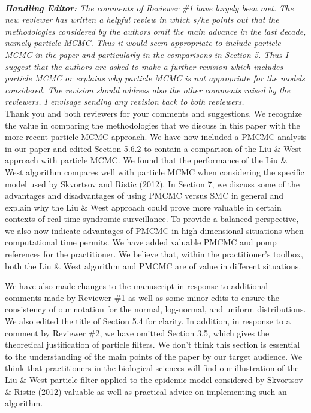 \documentclass{article}
\begin{document}
 \\

\noindent \emph{{\bf Handling Editor:} The comments of Reviewer \#1 have largely been met.  The new reviewer has written a helpful review in which s/he points out that the methodologies considered by the authors omit the main advance in the last decade, namely particle MCMC.  Thus it would seem appropriate to include particle MCMC in the paper and particularly in the comparisons in Section 5.  Thus I suggest that the authors are asked to make a further revision which includes particle MCMC or explains why particle MCMC is not appropriate for the models considered.  The revision should address also the other comments raised by the reviewers.  I envisage sending any revision back to both reviewers.} \\

Thank you and both reviewers for your comments and suggestions. We recognize the value in comparing the methodologies that we discuss in this paper with the more recent particle MCMC approach. We have now included a PMCMC analysis in our paper and edited Section 5.6.2 to contain a comparison of the Liu \& West approach with particle MCMC. We found that the performance of the Liu \& West algorithm compares well with particle MCMC when considering the specific model used by Skvortsov and Ristic (2012). In Section 7, we discuss some of the advantages and disadvantages of using PMCMC versus SMC in general and explain why the Liu \& West approach could prove more valuable in certain contexts of real-time syndromic surveillance. To provide a balanced perspective, we also now indicate advantages of PMCMC in high dimensional situations when computational time permits. We have added valuable PMCMC and pomp references for the practitioner. We believe that, within the practitioner's toolbox, both the Liu \& West algorithm and PMCMC are of value in different situations.

We have also made changes to the manuscript in response to additional comments made by Reviewer \#1 as well as some minor edits to ensure the consistency of our notation for the normal, log-normal, and uniform distributions. We also edited the title of Section 5.4 for clarity. In addition, in response to a comment by Reviewer \#2, we have omitted Section 3.5, which gives the theoretical justification of particle filters. We don't think this section is essential to the understanding of the main points of the paper by our target audience. We think that practitioners in the biological sciences will find our illustration of the Liu \& West particle filter applied to the epidemic model considered by Skvortsov \& Ristic (2012) valuable as well as practical advice on implementing such an algorithm. \\
\end{document}

